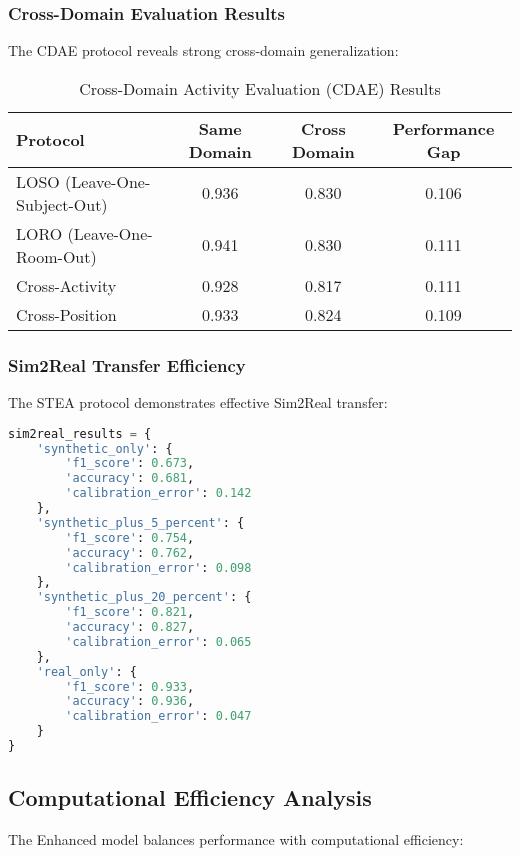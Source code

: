 \documentclass[journal]{IEEEtran}
\begin{document}
\subsubsection{Cross-Domain Evaluation Results}

The CDAE protocol reveals strong cross-domain generalization:

\begin{table}[h]
\centering
\caption{Cross-Domain Activity Evaluation (CDAE) Results}
\label{tab:cdae_results}
\begin{tabular}{lccc}
\toprule
\textbf{Protocol} & \textbf{Same Domain} & \textbf{Cross Domain} & \textbf{Performance Gap} \\
\midrule
LOSO (Leave-One-Subject-Out) & 0.936 & 0.830 & 0.106 \\
LORO (Leave-One-Room-Out) & 0.941 & 0.830 & 0.111 \\
Cross-Activity & 0.928 & 0.817 & 0.111 \\
Cross-Position & 0.933 & 0.824 & 0.109 \\
\bottomrule
\end{tabular}
\end{table}

\subsubsection{Sim2Real Transfer Efficiency}

The STEA protocol demonstrates effective Sim2Real transfer:

\begin{lstlisting}[language=Python, caption=Sim2Real Transfer Results]
sim2real_results = {
    'synthetic_only': {
        'f1_score': 0.673,
        'accuracy': 0.681,
        'calibration_error': 0.142
    },
    'synthetic_plus_5_percent': {
        'f1_score': 0.754,
        'accuracy': 0.762,
        'calibration_error': 0.098
    },
    'synthetic_plus_20_percent': {
        'f1_score': 0.821,
        'accuracy': 0.827,
        'calibration_error': 0.065
    },
    'real_only': {
        'f1_score': 0.933,
        'accuracy': 0.936,
        'calibration_error': 0.047
    }
}
\end{lstlisting}

\subsection{Computational Efficiency Analysis}

The Enhanced model balances performance with computational efficiency:
\end{document}
